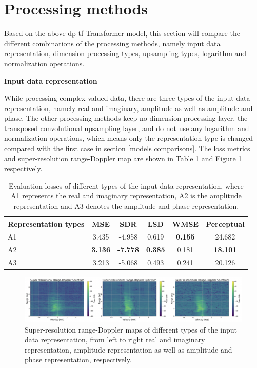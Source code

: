 \section{Processing methods} \label{processing methods comparisons}
Based on the above \gls{dp}-\gls{tf} Transformer model, this section will compare the different combinations of the processing methods, namely input data representation, dimension processing types, upsampling types, logarithm and normalization operations.

\begin{spacing}{1.5}
\textbf{\large{Input data representation}}
\end{spacing}
While processing complex-valued data, there are three types of the input data representation, namely real and imaginary, amplitude as well as amplitude and phase. The other processing methods keep no dimension processing layer, the transposed convolutional upsampling layer, and do not use any logarithm and normalization operations, which means only the representation type is changed compared with the first case in section \ref{models comparisons}. The loss metrics and super-resolution range-Doppler map are shown in Table \ref{Evaluation losses of the separation types comparison} and Figure \ref{Super-resolution images of the separation types} respectively.

\begin{table}
    \centering
    \caption{Evaluation losses of different types of the input data representation, where A1 represents the real and imaginary representation, A2 is the amplitude representation and A3 denotes the amplitude and phase representation.}
    \label{Evaluation losses of the separation types comparison}
    \begin{tabular}{l|c|c|c|c|c}
        \hline
        Representation types & MSE & SDR & LSD & WMSE & Perceptual \\
        \hline
        A1 & 3.435 & -4.958 & 0.619 & \textbf{0.155} & 24.682 \\
        \hline
        A2 & \textbf{3.136} & \textbf{-7.778} & \textbf{0.385} & 0.181 & \textbf{18.101} \\
        \hline
        A3 & 3.213 & -5.068 & 0.493 & 0.241 & 20.126 \\
        \hline
    \end{tabular}
\end{table}

\begin{figure}
    \centering
    \includegraphics[scale=.45]{figures/evaluation_processing_mse_A.png}
    \caption{Super-resolution range-Doppler maps of different types of the input data representation, from left to right real and imaginary representation, amplitude representation as well as amplitude and phase representation, respectively.}
    \label{Super-resolution images of the separation types}
\end{figure}


